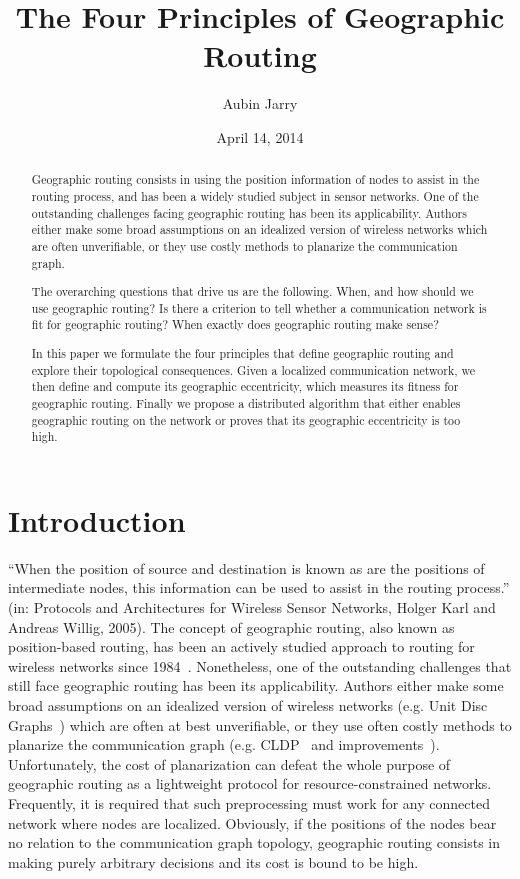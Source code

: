 \documentclass{article}
\author{Aubin Jarry}
\title{The Four Principles of Geographic Routing}
\date{April 14, 2014}
\begin{document}
\maketitle

\begin{abstract}
Geographic routing consists in using the position information of nodes to assist in the routing process, and has been a widely studied subject in sensor networks.
One of the outstanding challenges facing geographic routing has been its applicability. Authors either make some broad assumptions on an idealized version of wireless networks which are often unverifiable, or they use costly methods to planarize the communication graph.

The overarching questions that drive us are the following. When, and how should we use geographic routing? Is there a criterion to tell whether a communication network is fit for geographic routing? When exactly does geographic routing make sense?

In this paper we formulate the four principles that define geographic routing and explore their topological consequences. Given a localized communication network, we then define and compute its geographic eccentricity, which measures its fitness for geographic routing. Finally we propose a distributed algorithm that either enables geographic routing on the network or proves that its geographic eccentricity is too high.
\end{abstract}

\section{Introduction}
``When the position of source and destination is known as are the positions of intermediate nodes, this information can be used to assist in the routing process.''  (in: Protocols and Architectures for Wireless Sensor Networks, Holger Karl and Andreas Willig, 2005\cite{bib_book}). The concept of geographic routing, also known as position-based routing, has been an actively studied approach to routing for wireless networks since 1984~\cite{bib_greedy}.
Nonetheless, one of the outstanding challenges that still face geographic routing has been its applicability. Authors either make some broad assumptions on an idealized version of wireless networks (e.g. Unit Disc Graphs~\cite{bib_udg}) which are often at best unverifiable, or they use often costly methods to planarize the communication graph (e.g. CLDP~\cite{bib_cldp} and improvements~\cite{bib_cldp_lazy}). Unfortunately, the cost of planarization can defeat the whole purpose of geographic routing as a lightweight protocol for resource-constrained networks. Frequently, it is required that such preprocessing must work for any connected network where nodes are localized. Obviously, if the positions of the nodes bear no relation to the communication graph topology, geographic routing consists in making purely arbitrary decisions and its cost is bound to be high.
\end{document}
